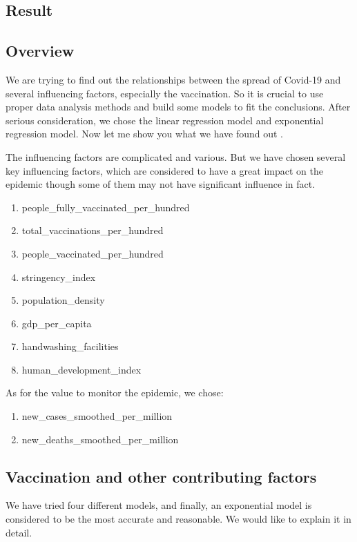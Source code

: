 \documentclass{article}
\begin{document}
\begin{multicols}{2}
\section{Result}
\subsection{Overview}
We are trying to find out the relationships between the spread of Covid-19 and several influencing factors, especially the vaccination. So it is crucial to use proper data analysis methods and build some models to fit the conclusions. After serious consideration, we chose the linear regression model and exponential regression model. Now let me show you what we have found out \cite{perez2010genomic}.

The influencing factors are complicated and various. But we have chosen several key influencing factors, which are considered to have a great impact on the epidemic though some of them may not have significant influence in fact.

\begin{enumerate}
    \item people\_fully\_vaccinated\_per\_hundred
    \item total\_vaccinations\_per\_hundred
    \item people\_vaccinated\_per\_hundred
    \item stringency\_index
    \item population\_density
    \item gdp\_per\_capita 
    \item handwashing\_facilities
    \item human\_development\_index
\end{enumerate}

As for the value to monitor the epidemic, we chose:
\begin{enumerate}
    \item new\_cases\_smoothed\_per\_million
    \item new\_deaths\_smoothed\_per\_million
\end{enumerate}

\subsection{Vaccination and other contributing factors}
We have tried four different models, and finally, an exponential model is considered to be the most accurate and reasonable. We would like to explain it in detail.


\end{multicols}
\end{document}
